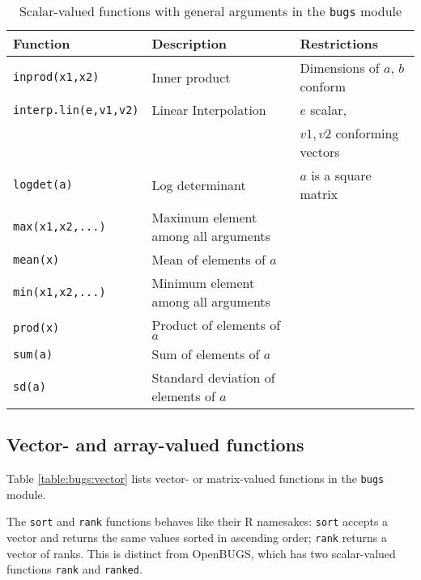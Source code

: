 \documentclass[11pt, a4paper, titlepage]{report}
\newcommand{\OpenBUGS}{\textsf{OpenBUGS}}
\begin{document}
\begin{table}
\begin{tabular}{lll}
\hline
Function & Description & Restrictions \\
\hline
\verb+inprod(x1,x2)+ & Inner product & Dimensions of $a$, $b$ conform \\
\verb+interp.lin(e,v1,v2)+ & Linear Interpolation & $e$ scalar, \\
                          &                     & $v1,v2$ conforming vectors \\
\verb+logdet(a)+ & Log determinant & $a$ is a square matrix \\
\verb+max(x1,x2,...)+ & Maximum element among all arguments & \\
\verb+mean(x)+  & Mean of elements of $a$ & \\
\verb+min(x1,x2,...)+ & Minimum element among all arguments & \\
\verb+prod(x)+  & Product of elements of $a$ & \\
\verb+sum(a)+   & Sum of elements of $a$& \\
\verb+sd(a)+    & Standard deviation of elements of $a$ & \\
\hline
\end{tabular}
\caption{Scalar-valued functions with general
  arguments in the \texttt{bugs} module \label{table:bugs:scalar2}}
\end{table}

\subsection{Vector- and array-valued functions}

Table \ref{table:bugs:vector} lists vector- or matrix-valued functions
in the \texttt{bugs} module.

The \texttt{sort} and \texttt{rank} functions behaves like their R
namesakes: \texttt{sort} accepts a vector and returns the same values
sorted in ascending order; \texttt{rank} returns a vector of ranks.
This is distinct from \OpenBUGS, which has two scalar-valued functions
\verb+rank+ and \verb+ranked+.
\end{document}
